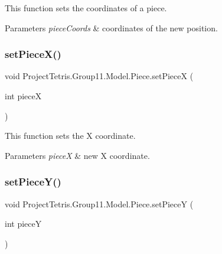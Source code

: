 This function sets the coordinates of a piece. 


\begin{DoxyParams}{Parameters}
{\em piece\+Coords} & coordinates of the new position. \\
\hline
\end{DoxyParams}
\hypertarget{class_project_tetris_1_1_group11_1_1_model_1_1_piece_a5ea3a78cfb66a1609cf259f9e624dfcb}{}\label{class_project_tetris_1_1_group11_1_1_model_1_1_piece_a5ea3a78cfb66a1609cf259f9e624dfcb} 
\subsubsection{\texorpdfstring{set\+Piece\+X()}{setPieceX()}}
{\footnotesize\ttfamily void Project\+Tetris.\+Group11.\+Model.\+Piece.\+set\+PieceX (\begin{DoxyParamCaption}\item[{int}]{pieceX }\end{DoxyParamCaption})}



This function sets the X coordinate. 


\begin{DoxyParams}{Parameters}
{\em pieceX} & new X coordinate. \\
\hline
\end{DoxyParams}
\hypertarget{class_project_tetris_1_1_group11_1_1_model_1_1_piece_a95bc4289b926d0dbc31cffee2089d464}{}\label{class_project_tetris_1_1_group11_1_1_model_1_1_piece_a95bc4289b926d0dbc31cffee2089d464} 
\subsubsection{\texorpdfstring{set\+Piece\+Y()}{setPieceY()}}
{\footnotesize\ttfamily void Project\+Tetris.\+Group11.\+Model.\+Piece.\+set\+PieceY (\begin{DoxyParamCaption}\item[{int}]{pieceY }\end{DoxyParamCaption})}



